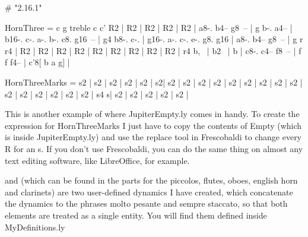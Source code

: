 \documentclass[../../LilyPond-Tutorials]{subfiles}
\begin{document}
\begin{lilypondcode}#
\version "2.16.1"


HornThree = {
       \transpose c g {
              \clef treble
              \key c \major
              \relative c' {
                     \PersonalSettings
                     R2 | %
                     R2 | %
                     R2 | %
                     R2 | %
                     R2 | %
                     a8-. b4-- g8~-- | %
                     g b-. a4-- | %
                     b16-. c-. a-. b-. c8. g16~-- | %
                     g4 b8-. c-. | %
                     g16-. a-. c-. e-. g8. g16 | %
                     a8-. b4-- g8~-- | %
                     g r r4 | %
                     R2 | %
                     R2 | %
                     R2 | %
                     R2 | %
                     R2 | %
                     R2 | %
                     R2 | %
                     R2 | %
                     R2 | %
                     r4 b,~ | %
                     b2~ | %
                     b | %
                     c8-. c4-- \partcombineApart f8~-- | %
                     f f f4-- | %
                     c'8[ b a g] | %
              }
       }
}

HornThreeMarks = {
       s2 | %
       s2 | %
       s2 | %
       s2 | %
       s2 | %
       s2\forteMoltoPesante | %
       s2 | %
       s2 | %
       s2 | %
       s2 | %
       s2 | %
       s2 | %
       s2 | %
       s2 | %
       s2 | %
       s2 | %
       s2 | %
       s2 | %
       s2 | %
       s2 | %
       s2 | %
       s4 s\fff | %
       s2 | %
       s2 | %
       s2 | %
       s2 | %
       s2 | %
}\end{lilypondcode}

This is another example of where JupiterEmpty.ly comes in handy. 
To create the expression for HornThreeMarks I just have to copy the contents of Empty (which is inside JupiterEmpty.ly) and use the replace tool in Frescobaldi to change every R for an s.
If you don't use Frescobaldi, you can do the same thing on almost any text editing software, like LibreOffice, for example.

 and  (which can be found in the parts for the piccolos, flutes, oboes, english horn and clarinets) are two user-defined dynamics I have created, which concatenate the dynamics to the phrases molto pesante and sempre staccato, so that both elements are treated as a single entity.
You will find them defined inside MyDefinitions.ly
\end{document}
